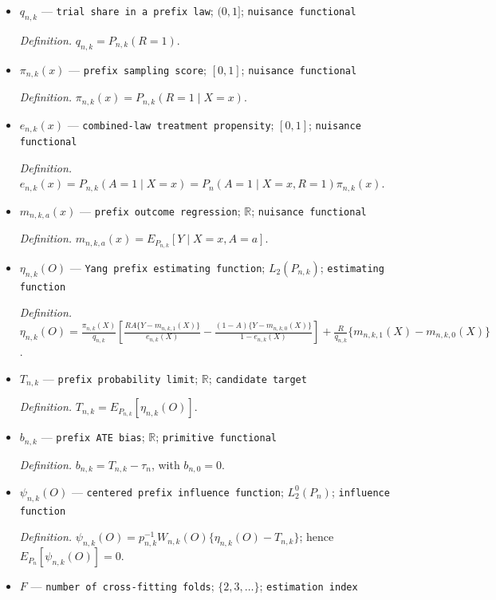 \documentclass{article}
\begin{document}
\begin{itemize}
  \par\smallskip\noindent\emph{Definition.} For every measurable set \(B\), \(P_{n,k}(B)=E_{P_n}[W_{n,k}(O)\mathbf 1\{O\in B\}]/p_{n,k}\).
  \item \(q_{n,k}\) --- \texttt{trial share in a prefix law}; \((0,1]\); \texttt{nuisance functional}
  \par\smallskip\noindent\emph{Definition.} \(q_{n,k}=P_{n,k}(R=1)\).
  \item \(\pi_{n,k}(x)\) --- \texttt{prefix sampling score}; \([0,1]\); \texttt{nuisance functional}
  \par\smallskip\noindent\emph{Definition.} \(\pi_{n,k}(x)=P_{n,k}(R=1\mid X=x)\).
  \item \(e_{n,k}(x)\) --- \texttt{combined-\allowbreak{}law treatment propensity}; \([0,1]\); \texttt{nuisance functional}
  \par\smallskip\noindent\emph{Definition.} \(e_{n,k}(x)=P_{n,k}(A=1\mid X=x)=P_n(A=1\mid X=x,R=1)\pi_{n,k}(x)\).
  \item \(m_{n,k,a}(x)\) --- \texttt{prefix outcome regression}; \(\mathbb R\); \texttt{nuisance functional}
  \par\smallskip\noindent\emph{Definition.} \(m_{n,k,a}(x)=E_{P_{n,k}}[Y\mid X=x,A=a]\).
  \item \(\eta_{n,k}(O)\) --- \texttt{Yang prefix estimating function}; \(L_2(P_{n,k})\); \texttt{estimating function}
  \par\smallskip\noindent\emph{Definition.} \(\eta_{n,k}(O)=\frac{\pi_{n,k}(X)}{q_{n,k}}[\frac{RA\{Y-m_{n,k,1}(X)\}}{e_{n,k}(X)}-\frac{(1-A)\{Y-m_{n,k,0}(X)\}}{1-e_{n,k}(X)}]+\frac{R}{q_{n,k}}\{m_{n,k,1}(X)-m_{n,k,0}(X)\}\).
  \item \(T_{n,k}\) --- \texttt{prefix probability limit}; \(\mathbb R\); \texttt{candidate target}
  \par\smallskip\noindent\emph{Definition.} \(T_{n,k}=E_{P_{n,k}}[\eta_{n,k}(O)]\).
  \item \(b_{n,k}\) --- \texttt{prefix ATE bias}; \(\mathbb R\); \texttt{primitive functional}
  \par\smallskip\noindent\emph{Definition.} \(b_{n,k}=T_{n,k}-\tau_n\), with \(b_{n,0}=0\).
  \item \(\psi_{n,k}(O)\) --- \texttt{centered prefix influence function}; \(L_2^0(P_n)\); \texttt{influence function}
  \par\smallskip\noindent\emph{Definition.} \(\psi_{n,k}(O)=p_{n,k}^{-1}W_{n,k}(O)\{\eta_{n,k}(O)-T_{n,k}\}\); hence \(E_{P_n}[\psi_{n,k}(O)]=0\).
  \item \(F\) --- \texttt{number of cross-\allowbreak{}fitting folds}; \(\{2,3,\ldots\}\); \texttt{estimation index}

\end{itemize}
\end{document}
